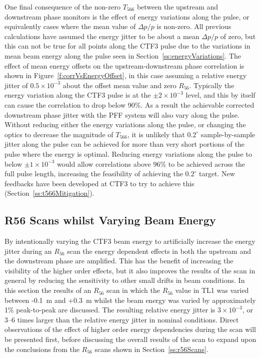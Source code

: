 One final consequence of the non-zero \(T_{566}\) between the upstream and downstream phase monitors is the effect of energy variations along the pulse, or equivalently cases where the mean value of \(\Delta p/p\) is non-zero. All previous calculations have assumed the energy jitter to be about a mean \(\Delta p / p\) of zero, but this can not be true for all points along the CTF3 pulse due to the variations in mean beam energy along the pulse seen in Section~\ref{ss:energyVariations}. The effect of mean energy offsets on the upstream-downstream phase correlation is shown in Figure~\ref{f:corrVsEnergyOffset}, in this case assuming a relative energy jitter of \(0.5\times10^{-3}\) about the offset mean value and zero \(R_{56}\). Typically the energy variation along the CTF3 pulse is at the \(\pm2\times10^{-3}\) level, and this by itself can cause the correlation to drop below 90\%. As a result the achievable corrected downstream phase jitter with the PFF system will also vary along the pulse. Without reducing either the energy variations along the pulse, or changing the optics to decrease the magnitude of \(T_{566}\), it is unlikely that \(0.2^\circ\) sample-by-sample jitter along the pulse can be achieved for more than very short portions of the pulse where the energy is optimal. Reducing energy variations along the pulse to below \(\pm1 \times10^{-3}\) would allow correlations above 96\% to be achieved across the full pulse length, increasing the feasibility of achieving the \(0.2^\circ\) target. New feedbacks have been developed at CTF3 to try to achieve this (Section~\ref{ss:t566Mitigation}).



\subsection{R56 Scans whilst Varying Beam Energy}
\label{ss:r56ScanWithEnergy}

By intentionally varying the CTF3 beam energy to artificially increase the energy jitter during an \(R_{56}\) scan the energy dependent effects in both the upstream and the downstream phase are amplified. This has the benefit of increasing the visibility of the higher order effects, but it also improves the results of the scan in general by reducing the sensitivity to other small drifts in beam conditions. In this section the results of an \(R_{56}\) scan in which the \(R_{56}\) value in TL1 was varied between -0.1~m and +0.3~m whilst the beam energy was varied by approximately 1\% peak-to-peak are discussed. The resulting relative energy jitter is \(3\times10^{-3}\), or 3--6 times larger than the relative energy jitter in nominal conditions. Direct observations of the effect of higher order energy dependencies during the scan will be presented first, before discussing the overall results of the scan to expand upon the conclusions from the \(R_{56}\) scans shown in Section~\ref{ss:r56Scans}.

